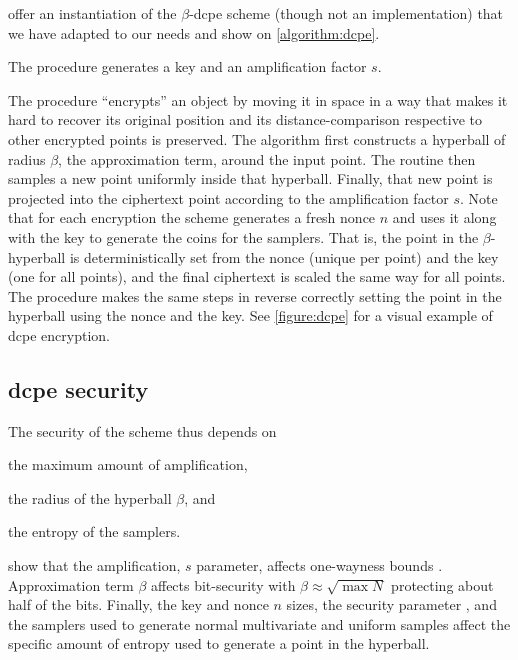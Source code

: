 			

			\textcite{dcpe} offer an instantiation of the $\beta$-\acrshort{dcpe} scheme (though not an implementation) that we have adapted to our needs and show on \cref{algorithm:dcpe}.

			The  procedure generates a key \key{} and an amplification factor $s$.

			The  procedure ``encrypts'' an object by moving it in space in a way that makes it hard to recover its original position and its distance-comparison respective to other encrypted points is preserved.
			The algorithm first constructs a hyperball of radius $\beta$, the approximation term, around the input point.
			The routine then samples a new point uniformly inside that hyperball.
			Finally, that new point is projected into the ciphertext point according to the amplification factor $s$.
			Note that for each encryption the scheme generates a fresh nonce $n$ and uses it along with the key \key{} to generate the coins for the samplers.
			That is, the point in the $\beta$-hyperball is deterministically set from the nonce (unique per point) and the key (one for all points), and the final ciphertext is scaled the same way for all points.
			The  procedure makes the same steps in reverse correctly setting the point in the hyperball using the nonce and the key.
			See \cref{figure:dcpe} for a visual example of \acrshort{dcpe} encryption.

			

		\subsection{\texorpdfstring{\acrshort{dcpe}}{DCPE} security}

			The security of the scheme thus depends on
			\begin{enumerate*}[label={(\roman*)}]
				\item the maximum amount of amplification,
				\item the radius of the hyperball $\beta$, and
				\item the entropy of the samplers.
			\end{enumerate*}
			\textcite{dcpe} show that the amplification, $s$ parameter, affects one-wayness bounds \cite[Section 7.2]{dcpe}.
			Approximation term $\beta$ affects bit-security with $\beta \approx \sqrt{\max N}$ protecting about half of the bits.
			Finally, the key \key{} and nonce $n$ sizes, the security parameter \secparam{}, and the samplers used to generate normal multivariate and uniform samples affect the specific amount of entropy used to generate a point in the hyperball.


